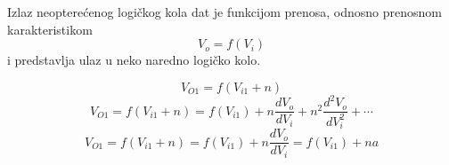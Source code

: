 \begin{frame}[label=08-s023]
\setlength{\parskip}{2pt}
\setlength{\abovedisplayskip}{4pt}\setlength{\belowdisplayskip}{4pt}
\gusttekst
Izlaz neopterećenog logičkog kola dat je funkcijom prenosa, odnosno prenosnom karakteristikom
\[V_o=f(V_i)\]
i predstavlja ulaz u neko naredno logičko kolo.\par\medskip
\centering
\[V_{O1}=f(V_{i1}+n)\]
\[V_{O1}=f(V_{i1}+n)=f(V_{i1})+n\frac{dV_o}{dV_i}+n^2\frac{d^2V_o}{dV_i^2}+\cdots\]
\bigskip
\[V_{O1}=f(V_{i1}+n)=f(V_{i1})+n\frac{dV_o}{dV_i}=f(V_{i1})+na\]
\end{frame}
